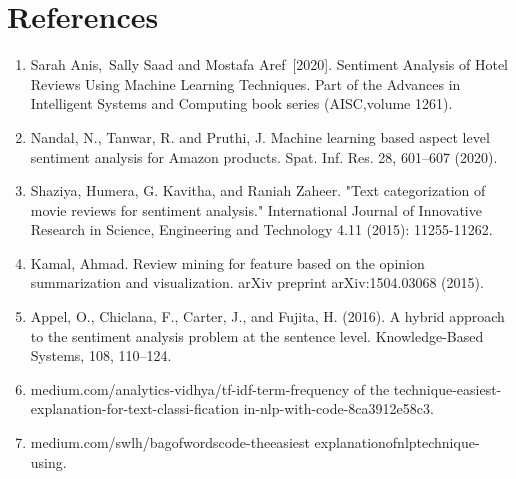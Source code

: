\section{References}
\begin{enumerate}



\item Sarah Anis, Sally Saad and Mostafa Aref [2020].
Sentiment Analysis of Hotel Reviews Using Machine Learning Techniques. Part of the Advances in Intelligent Systems and Computing book series (AISC,volume 1261).
\item Nandal, N., Tanwar, R. and Pruthi, J. Machine learning based aspect level sentiment analysis for Amazon products. Spat. Inf. Res. 28, 601–607 (2020).
\item Shaziya, Humera, G. Kavitha, and Raniah Zaheer. "Text categorization of movie reviews for sentiment analysis." International Journal of Innovative Research in Science, Engineering and Technology 4.11 (2015): 11255-11262.


\item Kamal, Ahmad. Review mining for feature based on the opinion summarization and visualization. arXiv preprint arXiv:1504.03068 (2015).


\item Appel, O., Chiclana, F., Carter, J., and Fujita, H. (2016). A hybrid approach to the sentiment analysis problem at the sentence level. Knowledge-Based Systems, 108, 110–124.
\item medium.com/analytics-vidhya/tf-idf-term-frequency of the
technique-easiest-explanation-for-text-classi-fication in-nlp-with-code-8ca3912e58c3.
\item medium.com/swlh/bag\-of\-words\-code-the\-easiest 
explanation\-of\-nlp\-technique-using.

\end{enumerate}


